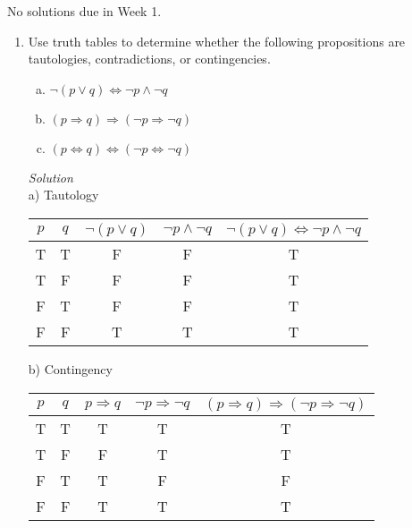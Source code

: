 \documentclass[12pt]{article}
\newif\ifsln
\renewcommand{\iff}{\Leftrightarrow}
\begin{document}
\pagestyle{fancyplain}


\lhead{\textbf{Tutorial 1 \ifsln Solutions \fi}}

\begin{center}
No solutions due in Week 1.
\end{center}

\begin{enumerate}[1.]

\item Use truth tables to determine whether the following propositions are tautologies, contradictions, or contingencies.

\begin{multicols}{3}
	\begin{enumerate}[a)]
	\item $\neg (p \vee q) \iff \neg p \wedge \neg q$
	\item $(p \Rightarrow q) \Rightarrow (\neg p \Rightarrow \neg q)$
	\item  $(p \Leftrightarrow q) \Leftrightarrow (\neg p \Leftrightarrow \neg q)$
	\end{enumerate}
\end{multicols}
 
\ifsln
\textit{Solution}\\
a) Tautology\\
\begin{tabular}{|c|c|c|c|c|}
\hline
$p$ & $q$ & $\neg(p \vee q)$ & $\neg p \wedge \neg q$ & $\neg (p \vee q) \iff \neg p \wedge \neg q$\\
\hline
T & T & F & F & T\\
T & F & F & F &T\\
F & T & F & F & T\\
F & F & T & T & T\\
\hline
\end{tabular}

b) Contingency\\
\begin{tabular}{|c|c|c|c|c|}
\hline
$p$ & $q$ & $p \Rightarrow q$ & $\neg p \Rightarrow \neg q$ & $(p \Rightarrow q) \Rightarrow (\neg p \Rightarrow \neg q)$\\
\hline
T & T & T & T & T\\
T & F & F &T &T\\
F & T & T & F & F\\
F & F & T & T & T\\
\hline
\end{tabular}


\end{enumerate}
\end{document}

